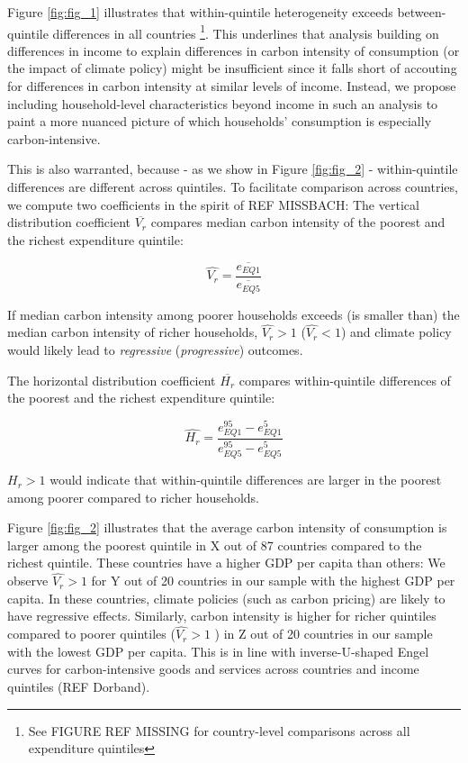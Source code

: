 \documentclass[12pt, a4paper]{article}
\begin{document}
Figure \ref{fig:fig_1} illustrates that within-quintile heterogeneity exceeds between-quintile differences in all countries \footnote{See FIGURE REF MISSING for country-level comparisons across all expenditure quintiles}. This underlines that analysis building on differences in income to explain differences in carbon intensity of consumption (or the impact of climate policy) might be insufficient since it falls short of accouting for differences in carbon intensity at similar levels of income. Instead, we propose including household-level characteristics beyond income in such an analysis to paint a more nuanced picture of which households' consumption is especially carbon-intensive. 

This is also warranted, because - as we show in Figure \ref{fig:fig_2} - within-quintile differences are different across quintiles. To facilitate comparison across countries, we compute two coefficients in the spirit of REF MISSBACH: The vertical distribution coefficient $\overline{V_{r}}$ compares median carbon intensity of the poorest and the richest expenditure quintile: 

\begin{equation}
    \widehat{V_{r}} = \frac{\overline{e_{EQ1}}}{\overline{e_{EQ5}}}
\end{equation}

If median carbon intensity among poorer households exceeds (is smaller than) the median carbon intensity of richer households, $\widehat{V_{r}}>1$ ($\widehat{V_{r}}<1$) and climate policy would likely lead to \textit{regressive} (\textit{progressive}) outcomes. 

The horizontal distribution coefficient $\overline{H_{r}}$ compares within-quintile differences of the poorest and the richest expenditure quintile:

\begin{equation}
    \widehat{H_{r}} = \frac{e_{EQ1}^{95} - e_{EQ1}^{5}}{e_{EQ5}^{95} - e_{EQ5}^{5}}
\end{equation}

$H_{r}>1$ would indicate that within-quintile differences are larger in the poorest among poorer compared to richer households.

Figure \ref{fig:fig_2} illustrates that the average carbon intensity of consumption is larger among the poorest quintile in X out of 87 countries compared to the richest quintile. These countries have a higher GDP per capita than others: We observe $\widehat{V_{r}}>1$ for Y out of 20 countries in our sample with the highest GDP per capita. In these countries, climate policies (such as carbon pricing) are likely to have regressive effects. Similarly, carbon intensity is higher for richer quintiles compared to poorer quintiles ($\widehat{V_{r}}>1$ ) in Z out of 20 countries in our sample with the lowest GDP per capita. This is in line with inverse-U-shaped Engel curves for carbon-intensive goods and services across countries and income quintiles (REF Dorband). %
\end{document}
